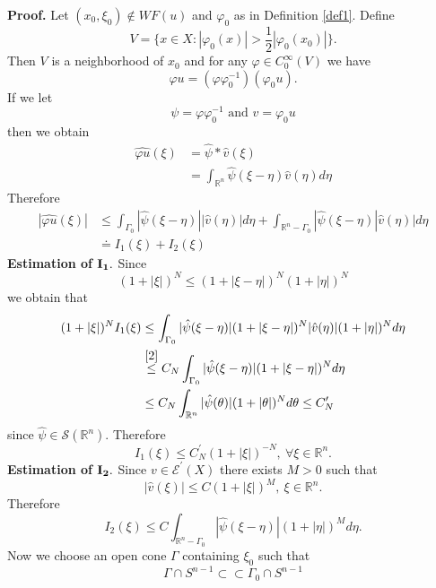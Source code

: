 \documentclass[12pt,reqno]{amsart}
\newcommand{\rr}{\mathbb{R}}
\theoremstyle{plain}  %
\theoremstyle{definition}
\newcommand{\nin}{\noindent}
\newcommand{\vph}{\varphi}
\begin{document}
\nin
{\bf Proof.}  Let $ (x_0, \xi_0) \notin WF(u) $ and $ \varphi_0 $ as in Definition
\ref{def1}.  Define
$$V = \{ x \in X: |\varphi_0 (x)| > \frac{1}{2} |\varphi_0 (x_0 )|\}.$$
Then $ V $ is a neighborhood of $ x_0 $ and for any $ \vph \in C^\infty_0 (V) $
we have
$$\varphi u= (\varphi \varphi^{-1}_0) (\varphi_0 u). $$
If we let
$$\psi = \varphi \varphi^{-1}_0 \text{ and } v = \varphi_0 u $$
 then we obtain
 \begin{equation*}
\begin{split}
\widehat{\varphi u} (\xi) &= \hat \psi * \hat v(\xi)\\
&= \int_{\rr^n} \hat \psi (\xi - \eta) \hat v(\eta) d \eta
\end{split}
\end{equation*}
Therefore
\begin{equation*}
\begin{split}
|\widehat{\varphi u} (\xi)| &\le \int_{\Gamma_0} |\hat \psi (\xi - \eta)| |\hat v
(\eta)| d \eta + \int_{\rr^n - \Gamma_0} |\hat \psi (\xi - \eta) |\hat v(\eta)
|d \eta\\
&\doteq I_1 (\xi) + I_2 (\xi) \end{split}
\end{equation*}
\noindent
{\bf Estimation of $\bold  I_{\bold 1}.$}  Since
$$(1 + |\xi|)^N \le (1 + |\xi - \eta|)^N (1 + |\eta|)^N$$
we obtain that
\begin{equation*}
\begin{split}
(1 + |\xi|)^N I_1 (\xi) &\le \int_{\Gamma_0} |\hat \psi (\xi - \eta)| (1 + |\xi -
\eta|)^N |\hat v(\eta)| (1 + |\eta|)^N d\eta\\
& \overset{\eqref{2}}{\le} C_N \int_{\Gamma_0} |\hat \psi (\xi - \eta) | (1 + |\xi -
\eta|)^N d\eta\\
&\le C_N \int_{\rr^n} |\hat \psi (\theta)| (1 + |\theta|)^N d \theta \le
C^\prime_N \end{split}
\end{equation*}
since $ \hat \psi \in \mathcal S(\rr^n)$.  Therefore
\begin{equation}
	\label{4}
	I_1 (\xi) \le C^\prime_N (1 + |\xi|)^{-N}, \ \forall \xi \in \rr^n. 
\end{equation}
{\bf Estimation of $\bold I_{\bold 2}.$}  Since $ v \in \mathcal E^\prime (X) $ there
exists $ M > 0 $ such that
$$| \hat v(\xi)| \le C(1 + |\xi|)^M, \ \xi \in \rr^n. $$
Therefore
$$I_2 (\xi) \le C \int_{\rr^n - \Gamma_0} |\hat \psi (\xi - \eta)| (1 +
|\eta|)^M d \eta.$$
Now we choose an open cone $ \Gamma $ containing $ \xi_0 $ such that
\begin{equation*}
	\Gamma \cap S^{n-1} \subset \subset \Gamma_0 \cap S^{n-1}
\end{equation*}
\end{document}
